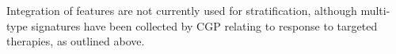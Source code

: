       Integration of features are not currently used for
      stratification, although multi-type signatures have been
      collected by CGP relating to response to targeted
      therapies, as outlined above. 
      

      



  

      

      

      

      





       
       


        

        
        

        


        